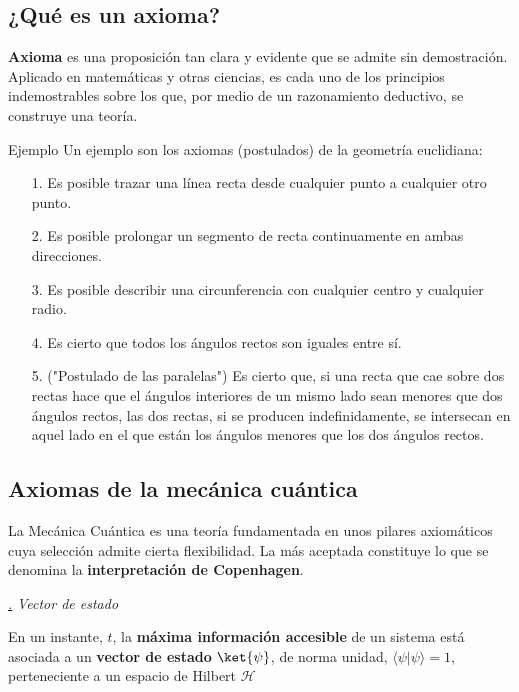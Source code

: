 \documentclass[a4paper,11pt]{book} %
\numberwithin{equation}{chapter}
\newcommand{\braket}[2]{\langle #1|#2\rangle}
\def\subsubiContadorIt{\par\addtocounter{subsubsection}{1}\underline{\it\thesubsubsection.}\hskip0.5cm \setcounter{subsubsubsectionIt}{0}}
\newcommand{\SubsubiIt}[1]{
		\subsubiContadorIt \textit{#1}
	}
\newcounter{subsubsubsectionIt}[subsubsection]
\begin{document}
		\subsection{¿Qué es un axioma?}

\begin{mybox_gray2}{}
\textbf{Axioma} es una proposición tan clara y evidente que se admite sin demostración. Aplicado en matemáticas y otras ciencias, es cada uno de los principios indemostrables sobre los que, por medio de un razonamiento deductivo, se construye una teoría.
\end{mybox_gray2}

\begin{mybox_green}{Ejemplo}
Un ejemplo son los axiomas (postulados) de la geometría euclidiana:
\begin{itemize}
	\item[1.] Es posible trazar una línea recta desde cualquier punto a cualquier otro punto.
	\item[2.] Es posible prolongar un segmento de recta continuamente en ambas direcciones.
	\item[3.] Es posible describir una circunferencia con cualquier centro y cualquier radio.
	\item[4.] Es cierto que todos los ángulos rectos son iguales entre sí.
	\item[5.] ("Postulado de las paralelas") Es cierto que, si una recta que cae sobre dos rectas hace que el ángulos interiores de un mismo lado sean menores que dos ángulos rectos, las dos rectas, si se producen indefinidamente, se intersecan en aquel lado en el que están los ángulos menores que los dos ángulos rectos.
\end{itemize}
\end{mybox_green}	
	

		\subsection{Axiomas de la mecánica cuántica}	

La Mecánica Cuántica es una teoría fundamentada en unos pilares axiomáticos cuya selección admite cierta flexibilidad. La más aceptada constituye lo que se denomina la \textbf{interpretación de Copenhagen}. 

		\SubsubiIt{Vector de estado}

\begin{mybox_gray2}{}
En un instante, $t$, la \textbf{máxima información accesible} de un sistema está asociada a un \textbf{vector de estado} $\ket{\psi}$, de norma unidad, $\braket{\psi}{\psi}=1$,  
perteneciente a un espacio de Hilbert $\mathcal{H}$
\end{mybox_gray2}
\end{document}
